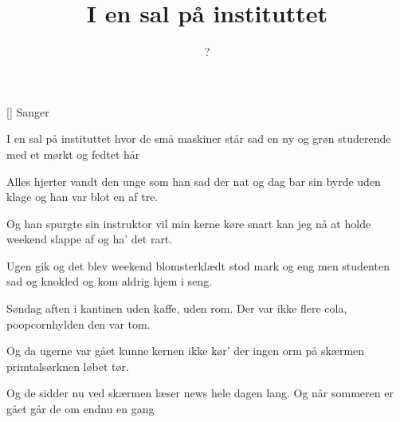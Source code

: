 \documentclass[a4paper,11pt]{article}
\title{I en sal på instituttet}
\author{?}
\begin{document}
\maketitle

\begin{roles}
[] Sanger
\end{roles}


\begin{song}
%
I en sal på instituttet
hvor de små maskiner står
sad en ny og grøn studerende
med et mørkt og fedtet hår

Alles hjerter vandt den unge
som han sad der nat og dag
bar sin byrde uden klage
og han var blot en af tre.

Og han spurgte sin instruktor
vil min kerne køre snart
kan jeg nå at holde weekend
slappe af og ha' det rart.

Ugen gik og det blev weekend
blomsterklædt stod mark og eng
men studenten sad og knokled
og kom aldrig hjem i seng.

Søndag aften i kantinen
uden kaffe, uden rom.
Der var ikke flere cola,
poopcornhylden den var tom.

Og da ugerne var gået
kunne kernen ikke kør'
der ingen orm på skærmen
primtalsørknen løbet tør.

Og de sidder nu ved skærmen
læser news hele dagen lang.
Og når sommeren er gået
går de om endnu en gang
\end{song}
\end{document}

